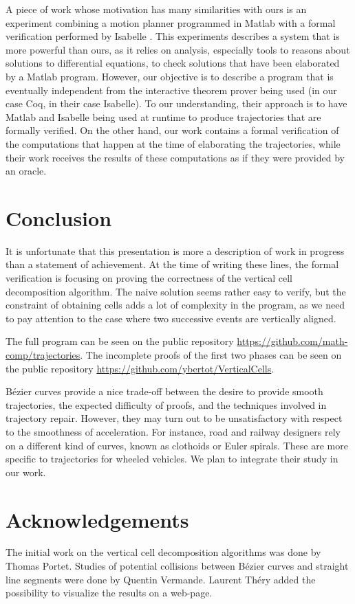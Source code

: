\documentclass{easychair}
\begin{document}
A piece of work whose motivation has many similarities with ours
is an experiment combining a motion planner programmed in Matlab with
a formal verification performed by Isabelle \cite{RizaldiISA18}.  This
experiments describes a system that is more powerful than ours, as it
relies on analysis, especially tools to reasons about solutions to
differential equations, to check solutions that have been elaborated by a
Matlab program.  However, our objective is to describe a program that
is eventually independent from the interactive theorem prover being
used (in our case Coq, in their case Isabelle).  To our understanding,
their approach is to have Matlab and Isabelle being used at runtime to
produce trajectories that are formally verified.  On the other hand,
our work contains a formal verification of the computations that happen at
the time of elaborating the trajectories, while their work receives
the results of these computations as if they were provided by an oracle.

\section{Conclusion}
It is unfortunate that this presentation is more a description of work
in progress than a statement of achievement.  At the time of writing
these lines, the formal verification
is focusing on proving the correctness of the vertical cell
decomposition algorithm.  The naive solution seems rather easy to
verify, but the constraint of obtaining cells adds a lot of complexity
in the program, as we need to pay attention to the case where two
successive events are vertically aligned.

The full program can be seen on the public repository \url{https://github.com/math-comp/trajectories}.  The incomplete proofs of the first two phases can be seen on the public repository \url{https://github.com/ybertot/VerticalCells}.

Bézier curves provide a nice trade-off between the desire to provide smooth
trajectories, the expected difficulty of proofs, and the techniques involved
in trajectory repair.  However, they may turn out to be unsatisfactory with
respect to the smoothness of acceleration.  For instance, road and railway
designers rely on a different kind of curves, known as clothoids or Euler
spirals.  These are more specific to trajectories for wheeled vehicles.
We plan to integrate their study in our work.
\section*{Acknowledgements}
The initial work on the vertical cell decomposition algorithms was
done by Thomas Portet.  Studies of potential collisions between Bézier
curves and straight line segments were done by Quentin Vermande.
Laurent Théry added the possibility to visualize the results on a
web-page.



\end{document}
